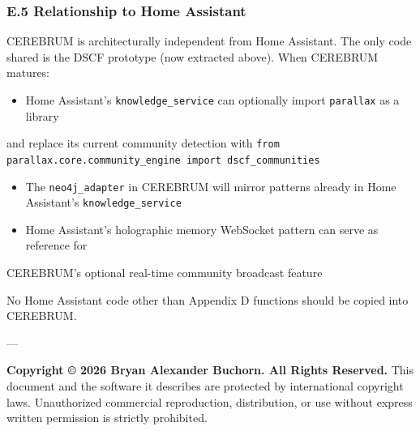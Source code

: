 \documentclass[10pt,journal,compsoc]{IEEEtran}
\begin{document}
\subsubsection{E.5 Relati\-onship to Home Assistant}

CEREBRUM is archi\-tecturally independent from Home Assistant. The only code shared is the
DSCF prototype (now extracted above). When CEREBRUM matures:

\begin{itemize}
\item Home Assistant's \texttt{knowledge\_service} can optionally import \texttt{parallax} as a library
\end{itemize}
  and replace its current community detection with \texttt{from parallax.core.community\_engine import dscf\_communities}
\begin{itemize}
\item The \texttt{neo4j\_adapter} in CEREBRUM will mirror patterns already in Home Assistant's \texttt{knowledge\_service}
\item Home Assistant's holographic memory WebSocket pattern can serve as reference for
\end{itemize}
  CEREBRUM's optional real-time community broadcast feature

No Home Assistant code other than Appendix D functions should be copied into CEREBRUM.

---

\textbf{Copyright © 2026 Bryan Alexander Buchorn. All Rights Reserved.}
This document and the software it describes are protected by inter\-national copyright laws. Unauth\-orized commercial repro\-duction, distr\-ibution, or use without express written permission is strictly prohibited.







\end{document}
